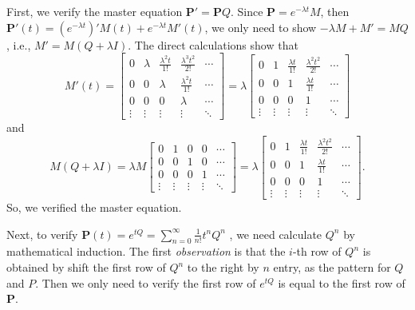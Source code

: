 \documentclass[  11pt]{article}
\newcommand{\Pm}{{\mathbf{P}}}
\begin{document}
\begin{ExerciseList}
First, we verify the master equation $\Pm' = \Pm Q$.
Since  $\Pm = e^{-\lambda t}M$, then $\Pm'(t)= (e^{-\lambda t})' M(t)+ e^{-\lambda t} M'(t)$,
we only need to show $-\lambda  M + M'=MQ$,
i.e., $M'=M(Q+\lambda I)$. The direct calculations show that
\[
M'(t)=\begin{bmatrix}
0& \lambda  & \frac{\lambda^2 t}{1!}   &  \frac{\lambda^3 t^2}{2!}   & \cdots \\
0 &0 & \lambda     & \frac{\lambda^2 t}{1!}   & \cdots \\
0 & 0 &0& \lambda   & \cdots \\
\vdots & \vdots & \vdots & \vdots & \ddots
\end{bmatrix}
=\lambda 
\begin{bmatrix}
0& 1  & \frac{\lambda t}{1!}   &  \frac{\lambda^2 t^2}{2!}   & \cdots \\
0 &0 & 1     & \frac{\lambda t}{1!}   & \cdots \\
0 & 0 &0& 1   & \cdots \\
\vdots & \vdots & \vdots & \vdots & \ddots
\end{bmatrix}
\] 
and \[
M(Q+\lambda I)=  \lambda  M
\begin{bmatrix}
0 & 1 & 0 & 0 & \cdots \\
0 & 0 & 1 & 0 & \cdots \\
0 & 0 &0&  1  & \cdots \\
\vdots & \vdots & \vdots & \vdots & \ddots
\end{bmatrix}=
\lambda 
\begin{bmatrix}
0& 1  & \frac{\lambda t}{1!}   &  \frac{\lambda^2 t^2}{2!}   & \cdots \\
0 &0 & 1     & \frac{\lambda t}{1!}   & \cdots \\
0 & 0 &0& 1   & \cdots \\
\vdots & \vdots & \vdots & \vdots & \ddots
\end{bmatrix}.
\]
So, we verified the master equation.

\medskip
Next, to verify $\Pm(t) =e^{tQ} = \sum_{n=0}^\infty \frac{1}{n !} t^nQ^n$ ,
we need calculate $Q^n$ by mathematical induction.
The first  {\it observation} is that the $i$-th row of $Q^n$
is obtained by shift the first row of $Q^n$ to the right by $n$ entry,
as the pattern for $Q$ and $P$.
Then we only need to verify the first row of $e^{tQ}$ is equal to the first row of $\Pm$. 


\end{ExerciseList}
\end{document}
